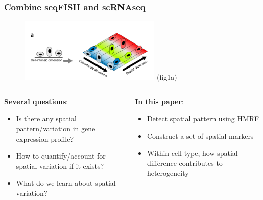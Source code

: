 \documentclass{beamer}
\begin{document}
  \begin{frame}
  \frametitle{Combine seqFISH and scRNAseq}
  \begin{figure}
    \centering
    \includegraphics[width=0.6\textwidth]{variation} (fig1a)
  \end{figure}
  \begin{columns}
  \begin{column}{0.5\textwidth}
    \textbf{Several questions}:
    \begin{itemize}
      \item Is there any spatial pattern/variation in gene expression profile?
      \item How to quantify/account for spatial variation if it exists?
      \item What do we learn about spatial variation?
    \end{itemize}
  \end{column}
  \begin{column}{0.5\textwidth}  %
    \textbf{In this paper}:
    \begin{itemize}
      \item Detect spatial pattern using HMRF
      \item Construct a set of spatial markers
      \item Within cell type, how spatial difference contributes to heterogeneity
    \end{itemize}
  \end{column}
  \end{columns}
  \end{frame}
\end{document}
